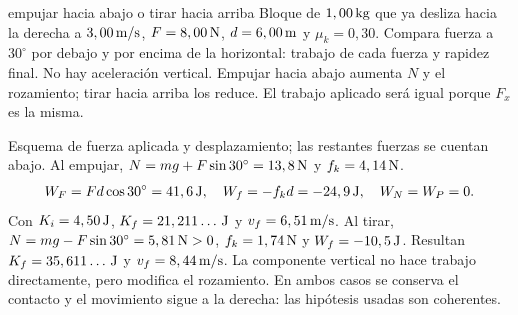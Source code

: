 \documentclass[11pt,a4paper]{article}
\begin{document}
\begin{examplebox}{empujar hacia abajo o tirar hacia arriba}
 Bloque de $1,00\,\mathrm{kg}$ que ya desliza hacia la derecha a
$3,00\,\mathrm{m/s}$, $F=8,00\,\mathrm{N}$, $d=6,00\,\mathrm{m}$ y $\mu_k=0,30$.
Compara fuerza a $30^\circ$ por debajo y por encima de la horizontal:
trabajo de cada fuerza y rapidez final.
\solutionblock
{} No hay aceleraci\'on vertical. Empujar hacia abajo aumenta $N$
y el rozamiento; tirar hacia arriba los reduce. El trabajo aplicado ser\'a
igual porque $F_x$ es la misma.
\begin{center}
\end{center}
Esquema de fuerza aplicada y desplazamiento; las restantes fuerzas se cuentan abajo.
 Al empujar, $N=mg+F\sin30^\circ=13,8\,\mathrm{N}$ y $f_k=4,14\,\mathrm{N}$.
\[
W_F=Fd\cos30^\circ=41,6\,\mathrm{J},\quad
W_f=-f_kd=-24,9\,\mathrm{J},\quad W_N=W_P=0.
\]
Con $K_i=4,50\,\mathrm{J}$, $K_f=21,211\ldots\,\mathrm{J}$ y $v_f=6,51\,\mathrm{m/s}$.
Al tirar, $N=mg-F\sin30^\circ=5,81\,\mathrm{N}>0$,
$f_k=1,74\,\mathrm{N}$ y $W_f=-10,5\,\mathrm{J}$.
Resultan $K_f=35,611\ldots\,\mathrm{J}$ y $v_f=8,44\,\mathrm{m/s}$.
 La componente vertical no hace trabajo directamente,
pero modifica el rozamiento. En ambos casos se conserva el contacto y el
movimiento sigue a la derecha: las hip\'otesis usadas son coherentes.
\end{examplebox}
\end{document}
